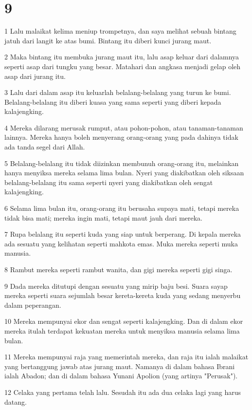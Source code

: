 \chapter{9}

\par 1 Lalu malaikat kelima meniup trompetnya, dan saya melihat sebuah bintang jatuh dari langit ke atas bumi. Bintang itu diberi kunci jurang maut.
\par 2 Maka bintang itu membuka jurang maut itu, lalu asap keluar dari dalamnya seperti asap dari tungku yang besar. Matahari dan angkasa menjadi gelap oleh asap dari jurang itu.
\par 3 Lalu dari dalam asap itu keluarlah belalang-belalang yang turun ke bumi. Belalang-belalang itu diberi kuasa yang sama seperti yang diberi kepada kalajengking.
\par 4 Mereka dilarang merusak rumput, atau pohon-pohon, atau tanaman-tanaman lainnya. Mereka hanya boleh menyerang orang-orang yang pada dahinya tidak ada tanda segel dari Allah.
\par 5 Belalang-belalang itu tidak diizinkan membunuh orang-orang itu, melainkan hanya menyiksa mereka selama lima bulan. Nyeri yang diakibatkan oleh siksaan belalang-belalang itu sama seperti nyeri yang diakibatkan oleh sengat kalajengking.
\par 6 Selama lima bulan itu, orang-orang itu berusaha supaya mati, tetapi mereka tidak bisa mati; mereka ingin mati, tetapi maut jauh dari mereka.
\par 7 Rupa belalang itu seperti kuda yang siap untuk berperang. Di kepala mereka ada sesuatu yang kelihatan seperti mahkota emas. Muka mereka seperti muka manusia.
\par 8 Rambut mereka seperti rambut wanita, dan gigi mereka seperti gigi singa.
\par 9 Dada mereka ditutupi dengan sesuatu yang mirip baju besi. Suara sayap mereka seperti suara sejumlah besar kereta-kereta kuda yang sedang menyerbu dalam peperangan.
\par 10 Mereka mempunyai ekor dan sengat seperti kalajengking. Dan di dalam ekor mereka itulah terdapat kekuatan mereka untuk menyiksa manusia selama lima bulan.
\par 11 Mereka mempunyai raja yang memerintah mereka, dan raja itu ialah malaikat yang bertanggung jawab atas jurang maut. Namanya di dalam bahasa Ibrani ialah Abadon; dan di dalam bahasa Yunani Apolion (yang artinya "Perusak").
\par 12 Celaka yang pertama telah lalu. Sesudah itu ada dua celaka lagi yang harus datang.

